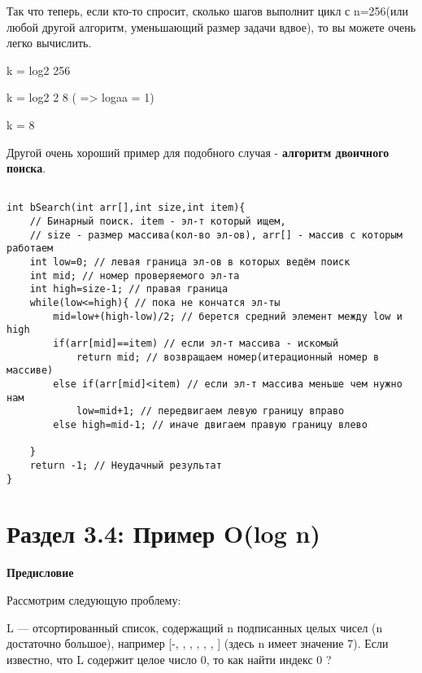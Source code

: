 \vspace{\baselineskip}
Так что теперь, если кто-то спросит, сколько шагов выполнит цикл с n=256(или любой другой алгоритм, уменьшающий размер задачи вдвое), то вы можете очень легко вычислить.

\vspace{\baselineskip}

k = log2 256\newline


k = log2 2 8 ( => logaa = 1)\newline


k = 8\newline


Другой очень хороший пример для подобного случая - \textbf{алгоритм двоичного поиска}.

\begin{tcolorbox}
\begin{verbatim}

int bSearch(int arr[],int size,int item){
	// Бинарный поиск. item - эл-т который ищем, 
	// size - размер массива(кол-во эл-ов), arr[] - массив с которым работаем
	int low=0; // левая граница эл-ов в которых ведём поиск
	int mid; // номер проверяемого эл-та
	int high=size-1; // правая граница
	while(low<=high){ // пока не кончатся эл-ты
		mid=low+(high-low)/2; // берется средний элемент между low и high
		if(arr[mid]==item) // если эл-т массива - искомый
			return mid; // возвращаем номер(итерационный номер в	 массиве)
		else if(arr[mid]<item) // если эл-т массива меньше чем нужно нам
			low=mid+1; // передвигаем левую границу вправо
		else high=mid-1; // иначе двигаем правую границу влево

	}
	return -1; // Неудачный результат
}
\end{verbatim}
\end{tcolorbox}

\section*{Раздел 3.4: Пример O(log n)}

\vspace{\baselineskip}
\textbf{Предисловие}

\vspace{\baselineskip}
Рассмотрим следующую проблему:

\vspace{\baselineskip}
L --- отсортированный список, содержащий n подписанных целых чисел (n достаточно большое), например [-{\color{Red}{5}}, {\color{Red}{-2}}, {\color{Red}{-1}}, {\color{Red}{0}}, {\color{Red}{1}}, {\color{Red}{2}}, {\color{Red}{4}}] (здесь n имеет значение 7). Если известно, что L содержит целое число 0, то как найти индекс 0 ?

